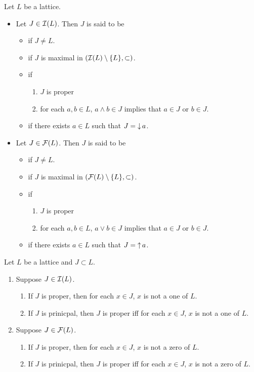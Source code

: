 \documentclass{book}
\begin{document}
	
	\begin{defn}
		Let $L$ be a lattice.
		\begin{itemize}
			\item Let $J \in \mathcal{I}(L)$. Then $J$ is said to be 
			\begin{itemize}
				\item {} if $J \neq L$. 
				\item {} if $J$ is maximal in $(\mathcal{I}(L) \setminus \{L\}, \subset)$. 
				\item {} if 
				\begin{enumerate}
					\item $J$ is proper 
					\item for each $a,b \in L$, $a \wedge b \in J$ implies that $a \in J$ or $b \in J$. 
				\end{enumerate}
				\item {} if there exists $a \in L$ such that $J = \operatorname{\downarrow} a$.
			\end{itemize}
			\item Let $J \in \mathcal{F}(L)$. Then $J$ is said to be 
			\begin{itemize}
				\item {} if $J \neq L$. 
				\item {} if $J$ is maximal in $(\mathcal{F}(L) \setminus \{L\}, \subset)$. 
				\item {} if 
				\begin{enumerate}
					\item $J$ is proper 
					\item for each $a,b \in L$, $a \vee b \in J$ implies that $a \in J$ or $b \in J$.
				\end{enumerate}
				\item {} if there exists $a \in L$ such that $J = \operatorname{\uparrow} a$. 
			\end{itemize}
		\end{itemize}
	\end{defn}
	
	\begin{ex}
		Let $L$ be a lattice and $J \subset L$.
		\begin{enumerate}
			\item Suppose $J \in \mathcal{I}(L)$. 
			\begin{enumerate}
				\item If $J$ is proper, then for each $x \in J$, $x$ is not a one of $L$.
				\item If $J$ is prinicpal, then $J$ is proper iff for each $x \in J$, $x$ is not a one of $L$.
			\end{enumerate}
			\item Suppose $J \in \mathcal{F}(L)$. 
			\begin{enumerate}
				\item If $J$ is proper, then for each $x \in J$, $x$ is not a zero of $L$.
				\item If $J$ is prinicpal, then $J$ is proper iff for each $x \in J$, $x$ is not a zero of $L$.
			\end{enumerate}
		\end{enumerate}
	\end{ex}
	
\end{document}
